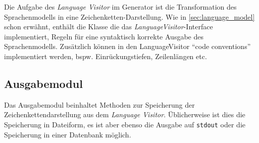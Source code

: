 Die Aufgabe des \emph{Language Visitor} im Generator ist die Transformation des Sprachenmodells in eine Zeichenketten-Darstellung. Wie in \cref{sec:language_model} schon erwähnt, enthält die Klasse die das \emph{LanguageVisitor}-Interface implementiert, Regeln für eine syntaktisch korrekte Ausgabe des Sprachenmodells. Zusätzlich können in den LanguageVisitor \enquote{code conventions} implementiert werden, bspw. Einrückungstiefen, Zeilenlängen etc.

\subsection{Ausgabemodul}
\label{sec:printer_module}

Das Ausgabemodul beinhaltet Methoden zur Speicherung der Zeichenkettendarstellung aus dem \emph{Language Visitor}. Üblicherweise ist dies die Speicherung in Dateiform, es ist aber ebenso die Ausgabe auf \texttt{stdout} oder die Speicherung in einer Datenbank möglich.